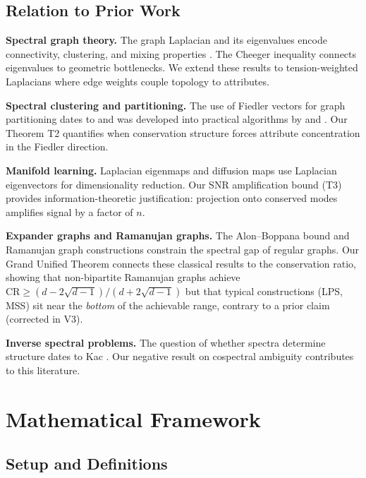 \documentclass[12pt,letterpaper]{article}
\newcommand{\CR}{\mathrm{CR}}
\begin{document}
\subsection{Relation to Prior Work}

\textbf{Spectral graph theory.} The graph Laplacian and its eigenvalues encode connectivity, clustering, and mixing properties \citep{chung1997,fiedler1973,mohar1991}. The Cheeger inequality \citep{cheeger1970,alon1985} connects eigenvalues to geometric bottlenecks. We extend these results to tension-weighted Laplacians where edge weights couple topology to attributes.

\textbf{Spectral clustering and partitioning.} The use of Fiedler vectors for graph partitioning dates to \citet{fiedler1973} and was developed into practical algorithms by \citet{shi2000} and \citet{ng2002}. Our Theorem T2 quantifies when conservation structure forces attribute concentration in the Fiedler direction.

\textbf{Manifold learning.} Laplacian eigenmaps \citep{belkin2003} and diffusion maps \citep{coifman2006} use Laplacian eigenvectors for dimensionality reduction. Our SNR amplification bound (T3) provides information-theoretic justification: projection onto conserved modes amplifies signal by a factor of $n$.

\textbf{Expander graphs and Ramanujan graphs.} The Alon--Boppana bound \citep{alon1986} and Ramanujan graph constructions \citep{lps1988,mss2015} constrain the spectral gap of regular graphs. Our Grand Unified Theorem connects these classical results to the conservation ratio, showing that non-bipartite Ramanujan graphs achieve $\CR \geq (d - 2\sqrt{d-1})/(d + 2\sqrt{d-1})$ but that typical constructions (LPS, MSS) sit near the \emph{bottom} of the achievable range, contrary to a prior claim (corrected in V3).

\textbf{Inverse spectral problems.} The question of whether spectra determine structure dates to Kac \citep{kac1966}. Our negative result on cospectral ambiguity \citep{vandam2003,haemers2004} contributes to this literature.

\section{Mathematical Framework}
\label{sec:framework}

\subsection{Setup and Definitions}
\label{sec:setup}
\end{document}
